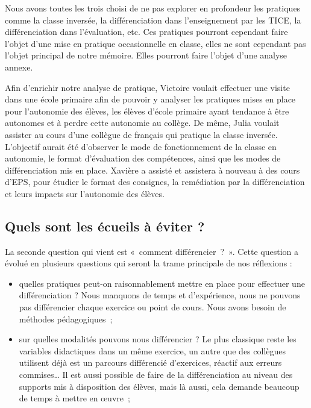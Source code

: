 Nous avons toutes les trois choisi de ne pas explorer en profondeur les pratiques comme la classe inversée, la différenciation dans l’enseignement par les TICE, la différenciation dans l’évaluation, etc. Ces pratiques pourront cependant faire l’objet d’une mise en pratique occasionnelle en classe, elles ne sont cependant pas l’objet principal de notre mémoire. Elles pourront faire l’objet d’une analyse annexe.

Afin d’enrichir notre analyse de pratique, Victoire voulait effectuer une visite dans une école primaire afin de pouvoir y analyser les pratiques mises en place pour l’autonomie des élèves, les élèves d’école primaire ayant tendance à être autonomes et à perdre cette autonomie au collège. De même, Julia voulait assister au cours d’une collègue de français qui pratique la classe inversée. L’objectif aurait été d’observer le mode de fonctionnement de la classe en autonomie, le format d’évaluation des compétences, ainsi que les modes de différenciation mis en place. Xavière a assisté et assistera à nouveau à des cours d’EPS, pour étudier le format des consignes, la remédiation par la différenciation et leurs impacts sur l’autonomie des élèves.

\subsection{Quels sont les écueils à éviter ?}


La seconde question qui vient est « comment différencier ? ». Cette question a évolué en plusieurs questions qui seront la trame principale de nos réflexions :
\begin{itemize}
    \item quelles pratiques peut-on raisonnablement mettre en place pour effectuer une différenciation ? Nous manquons de temps et d’expérience, nous ne pouvons pas différencier chaque exercice ou point de cours. Nous avons besoin de méthodes pédagogiques ;
    \item sur quelles modalités pouvons nous différencier ? Le plus classique reste les variables didactiques dans un même exercice, un autre que des collègues utilisent déjà est un parcours différencié d’exercices, réactif aux erreurs commises… Il est aussi possible de faire de la différenciation au niveau des supports mis à disposition des élèves, mais là aussi, cela demande beaucoup de temps à mettre en œuvre ;
\end{itemize}

